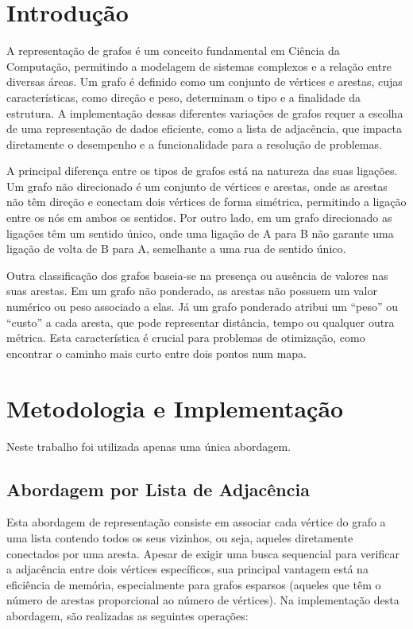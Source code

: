 \documentclass[12pt]{article}
\begin{document}
\section{Introdução}
A representação de grafos é um conceito fundamental em Ciência da Computação, 
permitindo a modelagem de sistemas complexos e a relação entre diversas áreas. Um grafo é 
definido como um conjunto de vértices e arestas, cujas características, como direção e peso, 
determinam o tipo e a finalidade da estrutura. A implementação dessas diferentes variações de 
grafos requer a escolha de uma representação de dados eficiente, como a lista de adjacência, que 
impacta diretamente o desempenho e a funcionalidade para a resolução de problemas.  

A principal diferença entre os tipos de grafos está na natureza das suas ligações. Um grafo 
não direcionado é um conjunto de vértices e arestas, onde as arestas não têm direção e conectam 
dois vértices de forma simétrica, permitindo a ligação entre os nós em ambos os sentidos. Por 
outro lado, em um grafo direcionado as ligações têm um sentido único, onde uma ligação de A 
para B não garante uma ligação de volta de B para A, semelhante a uma rua de sentido único. 

Outra classificação dos grafos baseia-se na presença ou ausência de valores nas suas 
arestas. Em um grafo não ponderado, as arestas não possuem um valor numérico ou peso associado 
a elas. Já um grafo ponderado atribui um ``peso'' ou ``custo'' a cada aresta, que pode representar 
distância, tempo ou qualquer outra métrica. Esta característica é crucial para problemas de 
otimização, como encontrar o caminho mais curto entre dois pontos num mapa. 

\section{Metodologia e Implementação}

Neste trabalho foi utilizada apenas uma única abordagem.

\subsection{Abordagem por Lista de Adjacência}
Esta abordagem de representação consiste em associar cada vértice do grafo a uma lista contendo 
todos os seus vizinhos, ou seja, aqueles diretamente conectados por uma aresta. Apesar de exigir 
uma busca sequencial para verificar a adjacência entre dois vértices específicos, sua principal 
vantagem está na eficiência de memória, especialmente para grafos esparsos (aqueles que têm o 
número de arestas proporcional ao número de vértices). Na implementação desta abordagem, são 
realizadas as seguintes operações:
\end{document}
